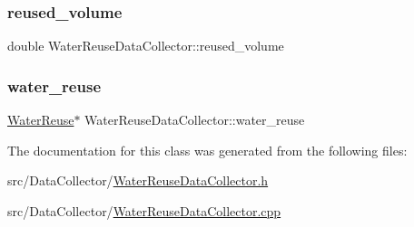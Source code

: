 \subsubsection{\texorpdfstring{reused\+\_\+volume}{reused\_volume}}
{\footnotesize\ttfamily double Water\+Reuse\+Data\+Collector\+::reused\+\_\+volume\hspace{0.3cm}{\ttfamily [private]}}

\mbox{\label{classWaterReuseDataCollector_a4ecf7e2de50415ac298104816b17d887_a4ecf7e2de50415ac298104816b17d887}} 
\subsubsection{\texorpdfstring{water\+\_\+reuse}{water\_reuse}}
{\footnotesize\ttfamily \mbox{\hyperlink{classWaterReuse}{Water\+Reuse}}$\ast$ Water\+Reuse\+Data\+Collector\+::water\+\_\+reuse\hspace{0.3cm}{\ttfamily [private]}}



The documentation for this class was generated from the following files\+:\begin{DoxyCompactItemize}
\item 
src/\+Data\+Collector/\mbox{\hyperlink{WaterReuseDataCollector_8h}{Water\+Reuse\+Data\+Collector.\+h}}\item 
src/\+Data\+Collector/\mbox{\hyperlink{WaterReuseDataCollector_8cpp}{Water\+Reuse\+Data\+Collector.\+cpp}}\end{DoxyCompactItemize}
